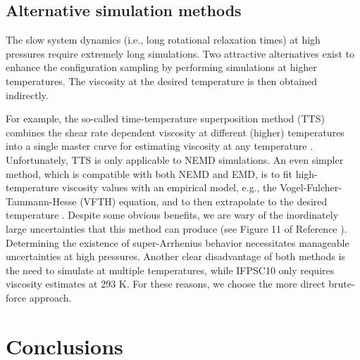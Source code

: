 \documentclass[preprint,review,12pt]{elsarticle}
\begin{document}
	\subsection{Alternative simulation methods}
	
	The slow system dynamics (i.e., long rotational relaxation times) at high pressures require extremely long simulations. Two attractive alternatives exist to enhance the configuration sampling by performing simulations at higher temperatures. The viscosity at the desired temperature is then obtained indirectly. 
	
	For example, the so-called time-temperature superposition method (TTS) combines the shear rate dependent viscosity at different (higher) temperatures into a single master curve for estimating viscosity at any temperature \cite{Khabaz2018,Voeltzel2016}. Unfortunately, TTS is only applicable to NEMD simulations. An even simpler method, which is compatible with both NEMD and EMD, is to fit high-temperature viscosity values with an empirical model, e.g., the Vogel-Fulcher-Tammann-Hesse (VFTH) equation, and to then extrapolate to the desired temperature \cite{Liu2015,Khabaz2018}. Despite some obvious benefits, we are wary of the inordinately large uncertainties that this method can produce (see Figure 11 of Reference ). Determining the existence of super-Arrhenius behavior necessitates manageable uncertainties at high pressures. Another clear disadvantage of both methods is the need to simulate at multiple temperatures, while IFPSC10 only requires viscosity estimates at 293 K. For these reasons, we choose the more direct brute-force approach.	
	
%	
	
	\section{Conclusions} \label{Conclusions}
	
\end{document}
